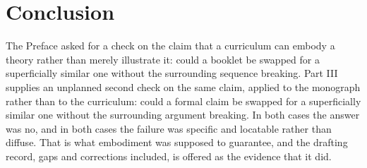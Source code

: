 \documentclass[11pt,twoside]{book}
\begin{document}
\chapter*{Conclusion}

The Preface asked for a check on the claim that a curriculum can embody a theory rather than merely illustrate it: could a booklet be swapped for a superficially similar one without the surrounding sequence breaking. Part III supplies an unplanned second check on the same claim, applied to the monograph rather than to the curriculum: could a formal claim be swapped for a superficially similar one without the surrounding argument breaking. In both cases the answer was no, and in both cases the failure was specific and locatable rather than diffuse. That is what embodiment was supposed to guarantee, and the drafting record, gaps and corrections included, is offered as the evidence that it did.
\end{document}
